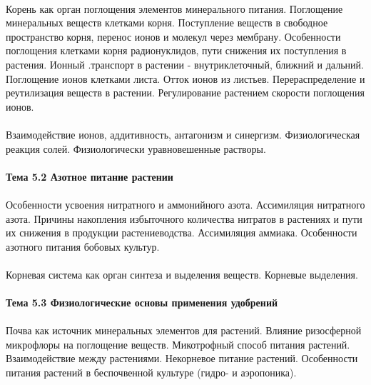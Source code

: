 \paragraph*{}Корень как орган поглощения элементов минерального питания. Поглощение минеральных веществ клетками корня. Поступление веществ в свободное пространство корня, перенос ионов и молекул через мембрану. Особенности поглощения клетками корня радионуклидов, пути снижения их поступления в растения. Ионный .транспорт в растении - внутриклеточный, ближний и дальний. Поглощение ионов клетками листа. Отток ионов из листьев. Перераспределение и реутилизация веществ в растении. Регулирование растением скорости поглощения ионов.

\paragraph*{}Взаимодействие ионов, аддитивность, антагонизм и синергизм. Физиологическая реакция солей. Физиологически уравновешенные растворы.

\paragraph*{Тема 5.2 Азотное питание растении}

\paragraph*{}Особенности усвоения нитратного и аммонийного азота. Ассимиляция нитратного азота. Причины накопления избыточного количества нитратов в растениях и пути их снижения в продукции растениеводства. Ассимиляция аммиака. Особенности азотного питания бобовых культур.
\paragraph*{}Корневая система как орган синтеза и выделения веществ. Корневые выделения.

\paragraph*{Тема 5.3 Физиологические основы применения удобрений}

\paragraph*{}Почва как источник минеральных элементов для растений. Влияние ризосферной микрофлоры на поглощение веществ. Микотрофный способ питания растений. Взаимодействие между растениями.
Некорневое питание растений.
Особенности питания растений в беспочвенной культуре (гидро- и аэропоника).

